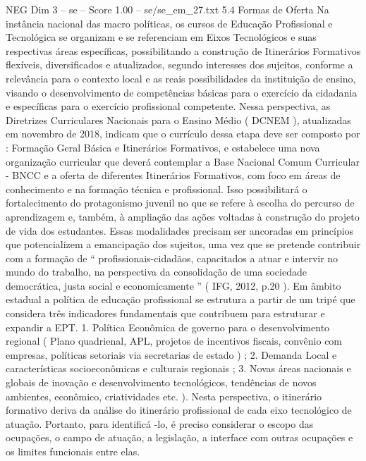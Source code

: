 \begin{textsample}{NEG Dim 3 – se – Score 1.00 – se/se\_em\_27.txt}  \label{ex:f3_neg_123}
5.4 Formas de Oferta Na instância nacional das macro políticas, os cursos de Educação Profissional e Tecnológica se organizam e se referenciam em Eixos Tecnológicos e suas respectivas áreas específicas, possibilitando a construção de Itinerários Formativos flexíveis, diversificados e atualizados, segundo interesses dos sujeitos, conforme a relevância para o contexto local e as reais possibilidades da instituição de ensino, visando o desenvolvimento de competências básicas para o exercício da cidadania e específicas para o exercício profissional competente.
Nessa perspectiva, as Diretrizes Curriculares Nacionais para o Ensino Médio ( DCNEM ), atualizadas em novembro de 2018, indicam que o currículo dessa etapa deve ser composto por : Formação Geral Básica e Itinerários Formativos, e estabelece uma nova organização curricular que deverá contemplar a Base Nacional Comum Curricular - BNCC e a oferta de diferentes Itinerários Formativos, com foco em áreas de conhecimento e na formação técnica e profissional.
Isso possibilitará o fortalecimento do protagonismo juvenil no que se refere à escolha do percurso de aprendizagem e, também, à ampliação das ações voltadas à construção do projeto de vida dos estudantes.
Essas modalidades precisam ser ancoradas em princípios que potencializem a emancipação dos sujeitos, uma vez que se pretende contribuir com a formação de “ profissionais-cidadãos, capacitados a atuar e intervir no mundo do trabalho, na perspectiva da consolidação de uma sociedade democrática, justa social e economicamente ” ( IFG, 2012, p.20 ).
Em âmbito estadual a política de educação profissional se estrutura a partir de um tripé que considera três indicadores fundamentais que contribuem para estruturar e expandir a EPT. 1.
Política Econômica de governo para o desenvolvimento regional ( Plano quadrienal, APL, projetos de incentivos fiscais, convênio com empresas, políticas setoriais via secretarias de estado ) ; 2.
Demanda Local e características socioeconômicas e culturais regionais ; 3.
Novas áreas nacionais e globais de inovação e desenvolvimento tecnológicos, tendências de novos ambientes, econômico, criatividades etc. ).
Nesta perspectiva, o itinerário formativo deriva da análise do itinerário profissional de cada eixo tecnológico de atuação.
Portanto, para identificá -lo, é preciso considerar o escopo das ocupações, o campo de atuação, a legislação, a interface com outras ocupações e os limites funcionais entre elas.

\end{textsample}
